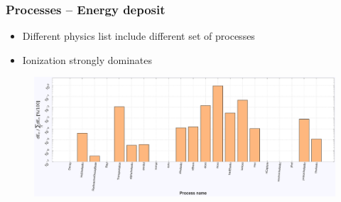 \begin{frame}
\frametitle{Processes -- Energy deposit}

\begin{block}{}
	\begin{itemize}
		\item Different physics list include different set of processes
		\item Ionization strongly dominates
	\end{itemize}
\end{block}

\begin{figure}
	\includegraphics[width=\textwidth]{images/process_dist_weighted_E120_phQGSP_INCLXX_HP.pdf}
\end{figure}

\end{frame}